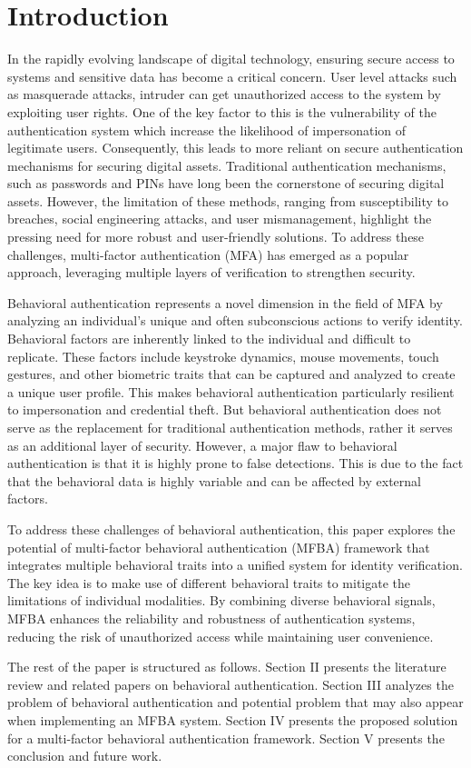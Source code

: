 
\section{Introduction}

In the rapidly evolving landscape of digital technology, ensuring secure access to systems and sensitive data has become a critical concern. 
User level attacks such as masquerade attacks, intruder can get unauthorized access to the system by exploiting user rights.
One of the key factor to this is the vulnerability of the authentication system
which increase the likelihood of impersonation of legitimate users.
Consequently, this leads to more reliant on secure authentication mechanisms for securing digital assets.  
Traditional authentication mechanisms, such as passwords and PINs have long been the cornerstone of securing digital assets. However, the limitation of these methods, ranging from susceptibility to breaches, social engineering attacks, and user mismanagement, highlight the pressing need for more robust and user-friendly solutions. To address these challenges, multi-factor authentication (MFA) has emerged as a popular approach, leveraging multiple layers of verification to strengthen security.

Behavioral authentication represents a novel dimension in the field of MFA by analyzing an individual's unique and often subconscious actions to verify identity.
Behavioral factors are inherently linked to the individual and difficult to replicate.
These factors include keystroke dynamics, mouse movements, touch gestures, and other biometric traits that can be captured and analyzed to create a unique user profile.
This makes behavioral authentication particularly resilient to impersonation and credential theft.
But behavioral authentication does not serve as the replacement for traditional authentication methods, rather it serves as an additional layer of security. 
However, a major flaw to behavioral authentication is that it is highly prone to false detections.
This is due to the fact that the behavioral data is highly variable and can be affected by external factors.

To address these challenges of behavioral authentication, 
this paper explores the potential of multi-factor behavioral authentication (MFBA) framework that integrates multiple behavioral traits into a unified system for identity verification.
The key idea is to make use of different behavioral traits to mitigate the limitations of individual modalities.
By combining diverse behavioral signals, MFBA enhances the reliability and robustness of authentication systems, reducing the risk of unauthorized access while maintaining user convenience.

The rest of the paper is structured as follows.
Section II presents the literature review and related papers on behavioral authentication.
Section III analyzes the problem of behavioral authentication and potential problem that may also appear when implementing an MFBA system. 
Section IV presents the proposed solution for a multi-factor behavioral authentication framework.
Section V presents the conclusion and future work.
